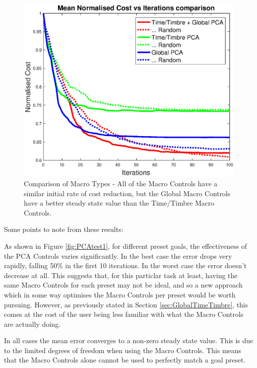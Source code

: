 \documentclass[11pt, oneside]{report}   	%
\begin{document}
\begin{figure}
	\centering
		\vspace{-40pt}
	\includegraphics[width = \textwidth]{PCAInterfaceTests2.eps}
	\caption{Comparison of Macro Types - All of the Macro Controls have a similar initial rate of cost reduction, but the Global Macro Controls have a better steady state value than the Time/Timbre Macro Controls.}
	\label{fig:PCAtest2}
\end{figure}

Some points to note from these results:

As shown in Figure \ref{fig:PCAtest1}, for different preset goals, the effectiveness of the PCA Controls varies significantly. In the best case the error drops very rapidly, falling 50\% in the first 10 iterations. In the worst case the error doesn't decrease at all. This suggests that, for this particlar task at least, having the same Macro Controls for each preset may not be ideal, and so a new approach which in some way optimises the Macro Controls per preset would be worth pursuing. However, as previously stated in Section \ref{sec:GlobalTimeTimbre}, this comes at the cost of the user being less familiar with what the Macro Controls are actually doing. 

In all cases the mean error converges to a non-zero steady state value. This is due to the limited degrees of freedom when using the Macro Controls. This means that the Macro Controls alone cannot be used to perfectly match a goal preset.
\end{document}
